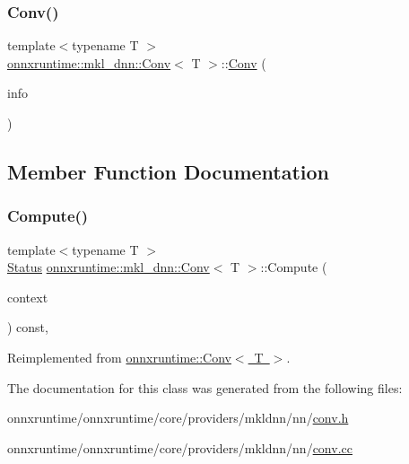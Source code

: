 \subsubsection{\texorpdfstring{Conv()}{Conv()}}
{\footnotesize\ttfamily template$<$typename T $>$ \\
\mbox{\hyperlink{classonnxruntime_1_1mkl__dnn_1_1Conv}{onnxruntime\+::mkl\+\_\+dnn\+::\+Conv}}$<$ T $>$\+::\mbox{\hyperlink{classonnxruntime_1_1mkl__dnn_1_1Conv}{Conv}} (\begin{DoxyParamCaption}\item[{const \mbox{\hyperlink{classonnxruntime_1_1OpKernelInfo}{Op\+Kernel\+Info}} \&}]{info }\end{DoxyParamCaption})\hspace{0.3cm}{\ttfamily [inline]}}



\subsection{Member Function Documentation}
\mbox{\label{classonnxruntime_1_1mkl__dnn_1_1Conv_a8db02bc5e1f3cd5ac0935c7ff52dc935}} 
\subsubsection{\texorpdfstring{Compute()}{Compute()}}
{\footnotesize\ttfamily template$<$typename T $>$ \\
\mbox{\hyperlink{classonnxruntime_1_1common_1_1Status}{Status}} \mbox{\hyperlink{classonnxruntime_1_1mkl__dnn_1_1Conv}{onnxruntime\+::mkl\+\_\+dnn\+::\+Conv}}$<$ T $>$\+::Compute (\begin{DoxyParamCaption}\item[{\mbox{\hyperlink{classonnxruntime_1_1OpKernelContext}{Op\+Kernel\+Context}} $\ast$}]{context }\end{DoxyParamCaption}) const\hspace{0.3cm}{\ttfamily [override]}, {\ttfamily [virtual]}}



Reimplemented from \mbox{\hyperlink{classonnxruntime_1_1Conv_adb9e3e9c31f9c69cc510b7fb64a56f2e}{onnxruntime\+::\+Conv$<$ T $>$}}.



The documentation for this class was generated from the following files\+:\begin{DoxyCompactItemize}
\item 
onnxruntime/onnxruntime/core/providers/mkldnn/nn/\mbox{\hyperlink{mkldnn_2nn_2conv_8h}{conv.\+h}}\item 
onnxruntime/onnxruntime/core/providers/mkldnn/nn/\mbox{\hyperlink{mkldnn_2nn_2conv_8cc}{conv.\+cc}}\end{DoxyCompactItemize}
